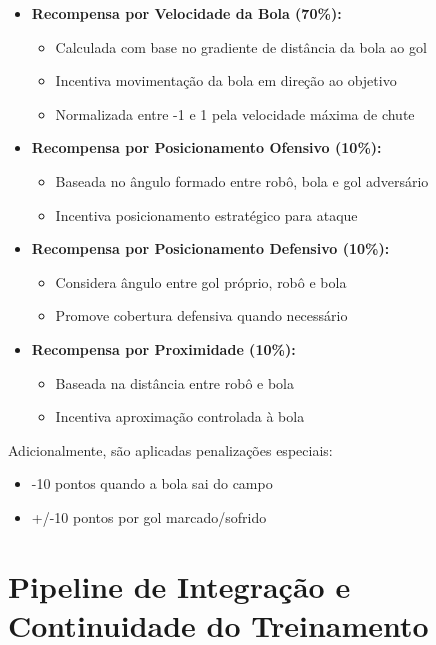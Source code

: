 \begin{itemize}
    \item \textbf{Recompensa por Velocidade da Bola (70\%):}
    \begin{itemize}
        \item Calculada com base no gradiente de distância da bola ao gol
        \item Incentiva movimentação da bola em direção ao objetivo
        \item Normalizada entre -1 e 1 pela velocidade máxima de chute
    \end{itemize}

    \item \textbf{Recompensa por Posicionamento Ofensivo (10\%):}
    \begin{itemize}
        \item Baseada no ângulo formado entre robô, bola e gol adversário
        \item Incentiva posicionamento estratégico para ataque
    \end{itemize}

    \item \textbf{Recompensa por Posicionamento Defensivo (10\%):}
    \begin{itemize}
        \item Considera ângulo entre gol próprio, robô e bola
        \item Promove cobertura defensiva quando necessário
    \end{itemize}

    \item \textbf{Recompensa por Proximidade (10\%):}
    \begin{itemize}
        \item Baseada na distância entre robô e bola
        \item Incentiva aproximação controlada à bola
    \end{itemize}
\end{itemize}

Adicionalmente, são aplicadas penalizações especiais:
\begin{itemize}
    \item -10 pontos quando a bola sai do campo
    \item +/-10 pontos por gol marcado/sofrido
\end{itemize}



\section{Pipeline de Integração e Continuidade do Treinamento}

